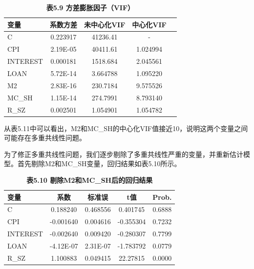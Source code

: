 \documentclass[12pt, a4paper]{article}
\numberwithin{equation}{section}
\begin{document}
\begin{table}[h!]
    \centering
    \captionsetup{labelformat=empty}
    \caption{\textbf{\fontsize{9pt}{11pt}\selectfont 表5.9 方差膨胀因子（VIF）}}
    \begin{tabular}{lcccc}
        \toprule
        变量       & 系数方差     & 未中心化VIF  & 中心化VIF   \\
        \midrule
        C        & 0.223917 & 41236.41 & -        \\
        CPI      & 2.19E-05 & 40411.61 & 1.024994 \\
        INTEREST & 0.000181 & 1518.684 & 2.045561 \\
        LOAN     & 5.72E-14 & 3.664788 & 1.095220 \\
        M2       & 2.83E-16 & 230.7184 & 9.575526 \\
        MC\_SH   & 1.15E-14 & 274.7991 & 8.793140 \\
        R\_SZ    & 0.002501 & 1.054901 & 1.054782 \\
        \bottomrule
    \end{tabular}
\end{table}

从表5.11中可以看出，M2和MC\_SH的中心化VIF值接近10，说明这两个变量之间可能存在多重共线性问题。

为了修正多重共线性问题，我们逐步剔除了多重共线性严重的变量，并重新估计模型。首先剔除M2和MC\_SH变量，回归结果如表5.10所示。

\begin{table}[h!]
    \centering
    \captionsetup{labelformat=empty}
    \caption{\textbf{\fontsize{9pt}{11pt}\selectfont 表5.10 剔除M2和MC\_SH后的回归结果}}
    \begin{tabular}{lcccc}
        \toprule
        变量       & 系数        & 标准误      & t值        & Prob.  \\
        \midrule
        C        & 0.188240  & 0.468556 & 0.401745  & 0.6888 \\
        CPI      & -0.001640 & 0.004616 & -0.355304 & 0.7232 \\
        INTEREST & -0.002640 & 0.009420 & -0.280307 & 0.7799 \\
        LOAN     & -4.12E-07 & 2.31E-07 & -1.783792 & 0.0779 \\
        R\_SZ    & 1.100883  & 0.049415 & 22.27815  & 0.0000 \\
        \bottomrule
    \end{tabular}
\end{table}
\end{document}
